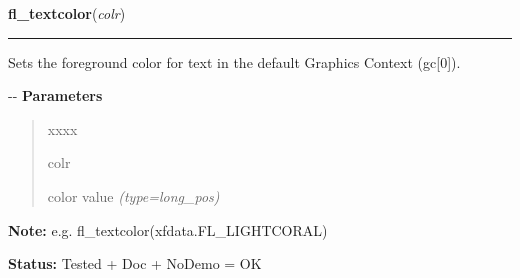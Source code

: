 \hspace{.8\funcindent}\begin{boxedminipage}{\funcwidth}

    \raggedright \textbf{fl\_textcolor}(\textit{colr})

    \vspace{-1.5ex}

    \rule{\textwidth}{0.5\fboxrule}
\setlength{\parskip}{2ex}

Sets the foreground color for text in the default Graphics Context
(gc{[}0{]}).

-{}-
\setlength{\parskip}{1ex}
      \textbf{Parameters}
      \vspace{-1ex}

      \begin{quote}
        \begin{Ventry}{xxxx}

          \item[colr]


color value
            {\it (type=long\_pos)}

        \end{Ventry}

      \end{quote}

\textbf{Note:} 
e.g. fl\_textcolor(xfdata.FL\_LIGHTCORAL)


\textbf{Status:} 
Tested + Doc + NoDemo = OK


    \end{boxedminipage}

    \label{xformslib:flbasic:fl_bk_textcolor}

    \vspace{0.5ex}

